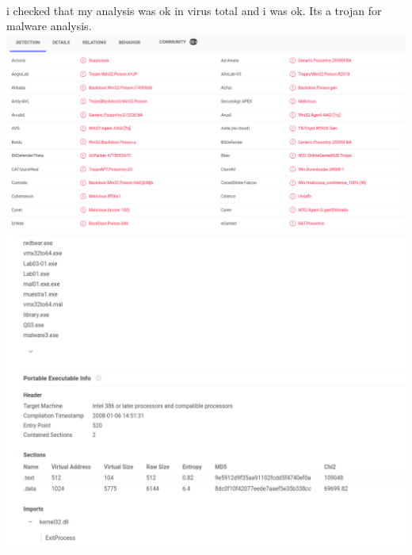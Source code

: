 \documentclass[10pt,a4paper]{article} %
\begin{document}
        \\ i checked that my analysis was ok in virus total and i was ok. Its a
        trojan for malware analysis.
        \\\includegraphics[width=0.8\linewidth]{trojan.png}
        \\
        \includegraphics[width=0.8\linewidth]{names.png}
        \\































    \nocite{*}
    
    
\end{document}

